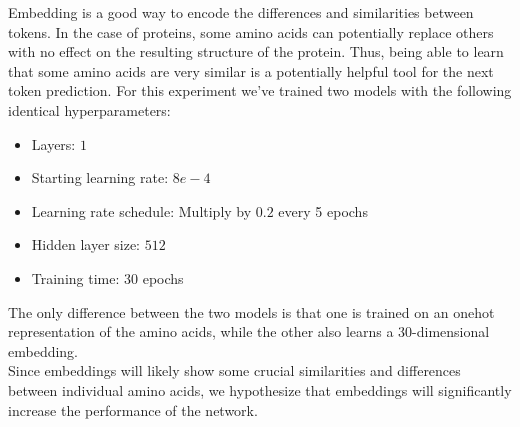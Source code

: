 Embedding is a good way to encode the differences and similarities between tokens. In the case of proteins, some amino acids can potentially replace others with no effect on the resulting structure of the protein. Thus, being able to learn that some amino acids are very similar is a potentially helpful tool for the next token prediction. For this experiment we've trained two models with the following identical hyperparameters:
\begin{itemize}
    \item Layers: $1$
    \item Starting learning rate: $8e-4$
    \item Learning rate schedule: Multiply by $0.2$ every 5 epochs
    \item Hidden layer size: $512$
    \item Training time: 30 epochs
\end{itemize}
The only difference between the two models is that one is trained on an onehot representation of the amino acids, while the other also learns a 30-dimensional embedding.\\

\noindent
Since embeddings will likely show some crucial similarities and differences between individual amino acids, we hypothesize that embeddings will significantly increase the performance of the network.